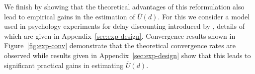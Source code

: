 We finish by showing that the theoretical advantages of this reformulation also lead to empirical gains in the estimation of $\bar{U}(d)$.  For this we consider a model used in psychology experiments for delay discounting introduced by \cite{vincent2016hierarchical}, details of which are given in Appendix~\ref{sec:exp-design}.  Convergence results
shown in Figure~\ref{fig:exp-conv} demonstrate that the theoretical convergence rates
are observed while results given in Appendix~\ref{sec:exp-design} show that this leads to significant practical gains 
in estimating $\bar{U}(d)$.
